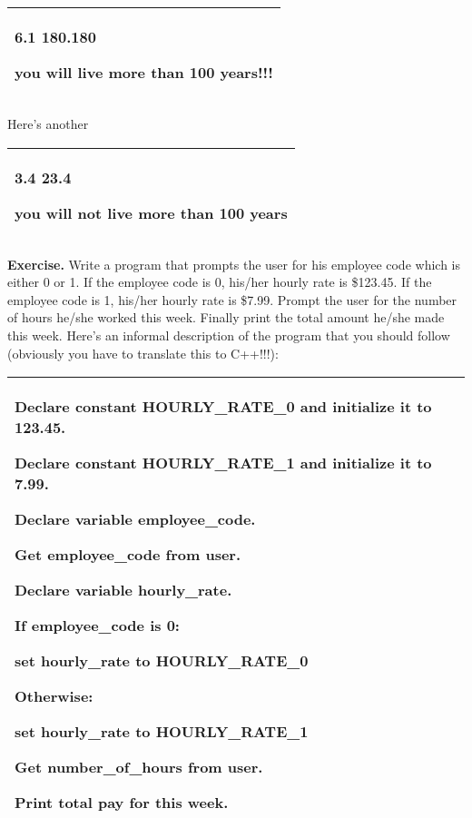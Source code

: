 \documentclass[
]{article}
\begin{document}
\begin{longtable}[]{@{}l@{}}
\toprule
\endhead
\begin{minipage}[t]{0.97\columnwidth}\raggedright
6.1 180.180

you will live more than 100 years!!!\strut
\end{minipage}\tabularnewline
\bottomrule
\end{longtable}

Here's another

\begin{longtable}[]{@{}l@{}}
\toprule
\endhead
\begin{minipage}[t]{0.97\columnwidth}\raggedright
3.4 23.4

you will not live more than 100 years\strut
\end{minipage}\tabularnewline
\bottomrule
\end{longtable}

\textbf{Exercise.} Write a program that prompts the user for his
employee code which is either 0 or 1. If the employee code is 0, his/her
hourly rate is \$123.45. If the employee code is 1, his/her hourly rate
is \$7.99. Prompt the user for the number of hours he/she worked this
week. Finally print the total amount he/she made this week. Here's an
informal description of the program that you should follow (obviously
you have to translate this to C++!!!):

\begin{longtable}[]{@{}l@{}}
\toprule
\endhead
\begin{minipage}[t]{0.97\columnwidth}\raggedright
Declare constant HOURLY\_RATE\_0 and initialize it to 123.45.

Declare constant HOURLY\_RATE\_1 and initialize it to 7.99.

Declare variable employee\_code.

Get employee\_code from user.

Declare variable hourly\_rate.

If employee\_code is 0:

set hourly\_rate to HOURLY\_RATE\_0

Otherwise:

set hourly\_rate to HOURLY\_RATE\_1

Get number\_of\_hours from user.

Print total pay for this week.\strut
\end{minipage}\tabularnewline
\bottomrule
\end{longtable}
\end{document}
